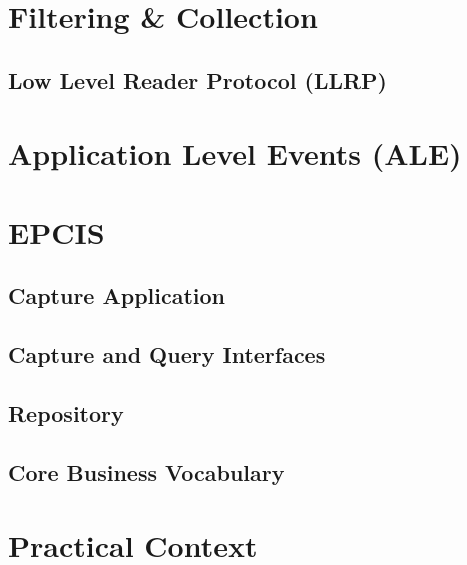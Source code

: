 \section{Filtering \& Collection}

\subsection{Low Level Reader Protocol (LLRP)}





\section{Application Level Events (ALE)}

\section{EPCIS}


\subsection{Capture Application}

\subsection{Capture and Query Interfaces}

\subsection{Repository}

\subsection{Core Business Vocabulary}

\section{Practical Context}


\cleardoublepage